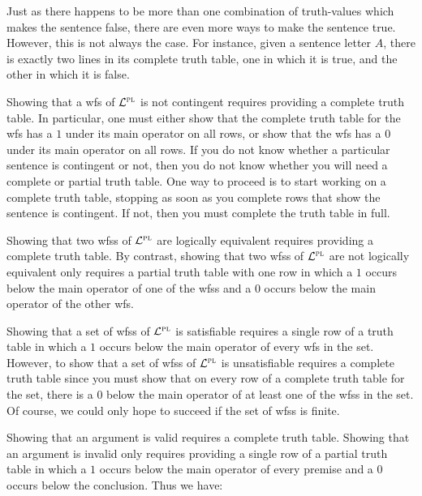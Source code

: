 Just as there happens to be more than one combination of truth-values which makes the sentence false, there are even more ways to make the sentence true.
However, this is not always the case.
For instance, given a sentence letter $A$, there is exactly two lines in its complete truth table, one in which it is true, and the other in which it is false.

Showing that a wfs of $\mathcal{L}^{\textsc{pl}}$ is not contingent requires providing a complete truth table. %
In particular, one must either show that the complete truth table for the wfs has a $1$ under its main operator on all rows, or show that the wfs has a $0$ under its main operator on all rows.
If you do not know whether a particular sentence is contingent or not, then you do not know whether you will need a complete or partial truth table.
One way to proceed is to start working on a complete truth table, stopping as soon as you complete rows that show the sentence is contingent.
If not, then you must complete the truth table in full.

Showing that two wfss of $\mathcal{L}^{\textsc{pl}}$ are logically equivalent requires providing a complete truth table.
By contrast, showing that two wfss of $\mathcal{L}^{\textsc{pl}}$ are not logically equivalent only requires a partial truth table with one row in which a $1$ occurs below the main operator of one of the wfss and a $0$ occurs below the main operator of the other wfs. 

Showing that a set of wfss of $\mathcal{L}^{\textsc{pl}}$ is satisfiable requires a single row of a truth table in which a $1$ occurs below the main operator of every wfs in the set.
However, to show that a set of wfss of $\mathcal{L}^{\textsc{pl}}$ is unsatisfiable requires a complete truth table since you must show that on every row of a complete truth table for the set, there is a $0$ below the main operator of at least one of the wfss in the set.
Of course, we could only hope to succeed if the set of wfss is finite.

Showing that an argument is valid requires a complete truth table.
Showing that an argument is invalid only requires providing a single row of a partial truth table in which a $1$ occurs below the main operator of every premise and a $0$ occurs below the conclusion.
Thus we have:

